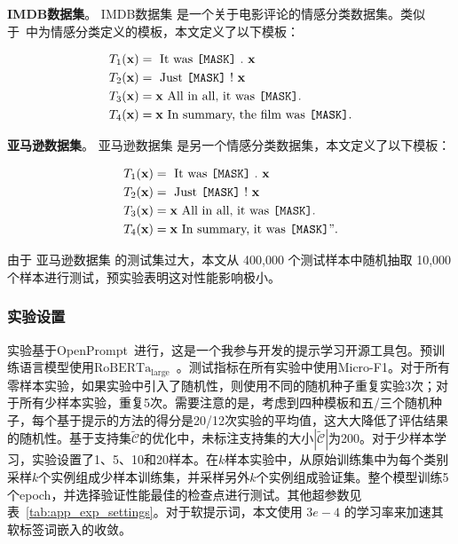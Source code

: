 \textbf{IMDB数据集}。 IMDB数据集 是一个关于电影评论的情感分类数据集。类似于~\cite{schick2020exploiting}中为情感分类定义的模板，本文定义了以下模板：

{\centering
\begin{mybox3}
\begin{align*}
       T_1(\mathbf{x}) & = \text{ It was \texttt{[MASK]} . } \mathbf{x}\\
    T_2(\mathbf{x}) &  = \text{ Just \texttt{[MASK]} ! } \mathbf{x}\\
      T_3(\mathbf{x}) & = \mathbf{x} \text{ All in all, it was } \texttt{[MASK]} . \\
      T_4(\mathbf{x}) & = \mathbf{x} \text{ In summary, the film was } \texttt{[MASK]}.  
\end{align*}
\end{mybox3}
}

\textbf{亚马逊数据集}。 亚马逊数据集 是另一个情感分类数据集，本文定义了以下模板：

{\centering
\begin{mybox}
\begin{align*}
       T_1(\mathbf{x}) & = \text{ It was \texttt{[MASK]} } .\  \mathbf{x}\\
    T_2(\mathbf{x}) &  = \text{ Just \texttt{[MASK]} ! } \mathbf{x}\\
      T_3(\mathbf{x}) & = \mathbf{x} \text{ All in all, it was  \texttt{[MASK]}} . \\
      T_4(\mathbf{x}) & = \mathbf{x} \text{ In summary, it was  \texttt{[MASK]}} ".  
\end{align*}
\end{mybox}
}

由于 亚马逊数据集 的测试集过大，本文从 400,000 个测试样本中随机抽取 10,000 个样本进行测试，预实验表明这对性能影响极小。



\subsubsection{实验设置}
实验基于OpenPrompt~\cite{ding2021openprompt}进行，这是一个我参与开发的提示学习开源工具包。预训练语言模型使用$\text{RoBERTa}_\text{large}$~\cite{liu2019roberta}。测试指标在所有实验中使用Micro-F1。对于所有零样本实验，如果实验中引入了随机性，则使用不同的随机种子重复实验3次；对于所有少样本实验，重复5次。需要注意的是，考虑到四种模板和五/三个随机种子，每个基于提示的方法的得分是20/12次实验的平均值，这大大降低了评估结果的随机性。基于支持集$\tilde{\mathcal{C}}$的优化中，未标注支持集的大小$|\tilde{\mathcal{C}}|$为200。对于少样本学习，实验设置了1、5、10和20样本。在$k$样本实验中，从原始训练集中为每个类别采样$k$个实例组成少样本训练集，并采样另外$k$个实例组成验证集。整个模型训练5个epoch，并选择验证性能最佳的检查点进行测试。其他超参数见表~\ref{tab:app_exp_settings}。对于软提示词，本文使用 $3e-4$ 的学习率来加速其软标签词嵌入的收敛。

